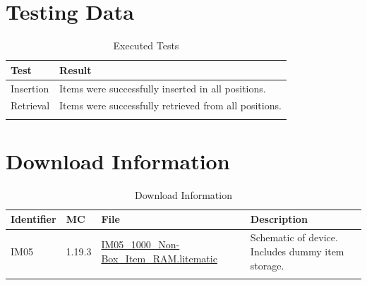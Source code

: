 \documentclass[10pt]{datasheet}
\begin{document}
\section{Testing Data}

\begin{table}[H]
\caption{Executed Tests}
\begin{tabularx}{\textwidth}{l | X}
    \thickhline
    \textbf{Test} & \textbf{Result} \\
    \hline
    Insertion & Items were successfully inserted in all positions. \\
    \hline
    Retrieval & Items were successfully retrieved from all positions. \\
    \thickhline
\end{tabularx}
\end{table}
    
\section{Download Information}
\begin{table}[H]
    \caption{Download Information}
    \begin{tabularx}{\textwidth}{l | l | l | X}
        \thickhline
        \textbf{Identifier} & \textbf{MC} & \textbf{File} & \textbf{Description} \\
        \hline
        IM05 & 1.19.3 & \href{https://github.com/Soontech-Annals/Archive/blob/2b73adfd252c5e2cf9d202454dbef78a586bc482/Archive/item-memory/IM05\%201000\%20Non-Box\%20Item\%20RAM/IM05\_1000\_Non-Box\_Item\_RAM.litematic?raw=1}{IM05\_1000\_Non-Box\_Item\_RAM.litematic} & Schematic of device. Includes dummy item storage. \\
        \hline
        \thickhline
    \end{tabularx}
\end{table}
\end{document}
